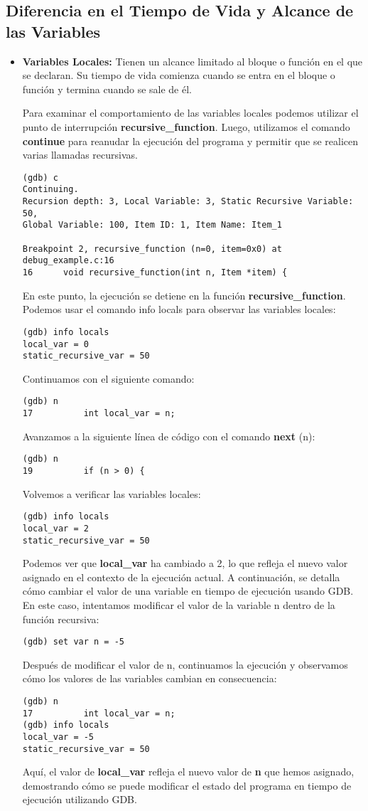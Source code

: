 \documentclass[12pt,a4paper]{article}
\begin{document}
\subsection{Diferencia en el Tiempo de Vida y Alcance de las Variables}
\begin{itemize}
\item \textbf{Variables Locales:} Tienen un alcance limitado al bloque o función en el que se declaran. Su tiempo de vida comienza cuando se entra en el bloque o función y termina cuando se sale de él.

Para examinar el comportamiento de las variables locales podemos utilizar el punto de interrupción \textbf{recursive\_function}. Luego, utilizamos el comando \textbf{continue} para reanudar la ejecución del programa y permitir que se realicen varias llamadas recursivas.
\begin{verbatim}
(gdb) c
Continuing.
Recursion depth: 3, Local Variable: 3, Static Recursive Variable: 50, 
Global Variable: 100, Item ID: 1, Item Name: Item_1

Breakpoint 2, recursive_function (n=0, item=0x0) at debug_example.c:16
16      void recursive_function(int n, Item *item) {
\end{verbatim}
En este punto, la ejecución se detiene en la función \textbf{recursive\_function}. Podemos usar el comando info locals para observar las variables locales:
\begin{verbatim}
(gdb) info locals
local_var = 0
static_recursive_var = 50		
\end{verbatim}
Continuamos con el siguiente comando:
\begin{verbatim}
(gdb) n
17          int local_var = n;
\end{verbatim}
Avanzamos a la siguiente línea de código con el comando \textbf{next} (n):
\begin{verbatim}
(gdb) n
19          if (n > 0) {
\end{verbatim}
Volvemos a verificar las variables locales:
\begin{verbatim}
(gdb) info locals
local_var = 2
static_recursive_var = 50
\end{verbatim}
Podemos ver que \textbf{local\_var }ha cambiado a 2, lo que refleja el nuevo valor asignado en el contexto de la ejecución actual.
A continuación, se detalla cómo cambiar el valor de una variable en tiempo de ejecución usando GDB. En este caso, intentamos modificar el valor de la variable n dentro de la función recursiva:
\begin{verbatim}
(gdb) set var n = -5	
\end{verbatim}
Después de modificar el valor de n, continuamos la ejecución y observamos cómo los valores de las variables cambian en consecuencia:
\begin{verbatim}
(gdb) n
17          int local_var = n;
(gdb) info locals
local_var = -5
static_recursive_var = 50		
\end{verbatim}
Aquí, el valor de \textbf{local\_var} refleja el nuevo valor de \textbf{n} que hemos asignado, demostrando cómo se puede modificar el estado del programa en tiempo de ejecución utilizando GDB.


\end{itemize}
\end{document}
